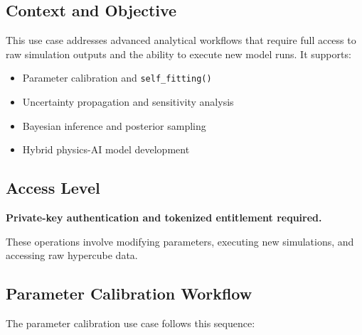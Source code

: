 \subsection{Context and Objective}

This use case addresses advanced analytical workflows that require full access to raw simulation outputs and the ability to execute new model runs. It supports:

\begin{itemize}
\item Parameter calibration and \texttt{self\_fitting()}
\item Uncertainty propagation and sensitivity analysis
\item Bayesian inference and posterior sampling
\item Hybrid physics-AI model development
\end{itemize}

\subsection{Access Level}

\textbf{Private-key authentication and tokenized entitlement required.}

These operations involve modifying parameters, executing new simulations, and accessing raw hypercube data.

\subsection{Parameter Calibration Workflow}

The parameter calibration use case follows this sequence:

